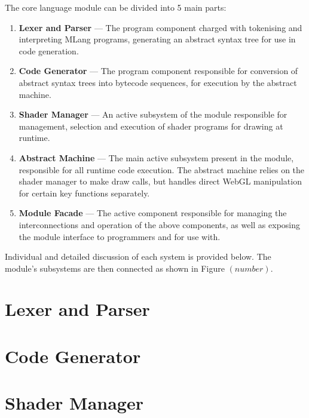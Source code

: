 \documentclass{l3proj}
\begin{document}
The core language module can be divided into 5 main parts:\begin{enumerate}
\item \textbf{Lexer and Parser} --- The program component charged with tokenising and interpreting MLang programs, generating an abstract syntax tree for use in code generation.
\item \textbf{Code Generator} --- The program component responsible for conversion of abstract syntax trees into bytecode sequences, for execution by the abstract machine.
\item \textbf{Shader Manager} --- An active subsystem of the module responsible for management, selection and execution of shader programs for drawing at runtime.
\item \textbf{Abstract Machine} --- The main active subsystem present in the module, responsible for all runtime code execution. The abstract machine relies on the shader manager to make draw calls, but handles direct WebGL manipulation for certain key functions separately.
\item \textbf{Module Facade} --- The active component responsible for managing the interconnections and operation of the above components, as well as exposing the module interface to programmers and for use with.
\end{enumerate}
Individual and detailed discussion of each system is provided below. The module's subsystems are then connected as shown in Figure $(\left. number\right.) $.

\section{Lexer and Parser}
\label{arch-lex}

\section{Code Generator}
\label{arch-gen}

\section{Shader Manager}
\label{arch-shad}

\end{document}
